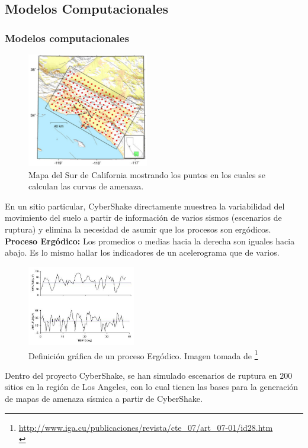 \documentclass{beamer}
\begin{document}
\subsection{Modelos Computacionales}
\begin{frame}[allowframebreaks]
\frametitle{Modelos computacionales}
%
\justifying
%
\begin{figure}[h]
	\centering
	\includegraphics[height=5cm]{img/Discretizacion.pdf}
	\caption{Mapa del Sur de California mostrando los puntos en los cuales se calculan las curvas de amenaza. \cite[figura 1, página 3]{gravesetal}}
\end{figure}
%
En un sitio particular, CyberShake directamente muestrea la variabilidad del movimiento del suelo a partir de información de varios sismos (escenarios de ruptura) y elimina la necesidad de asumir que los procesos son ergódicos.\\
%
\textbf{Proceso Ergódico:} Los promedios o medias hacia la derecha son iguales hacia abajo. Es lo mismo hallar los indicadores de un acelerograma que de varios.\\

\begin{figure}[h]
	\centering
	\includegraphics[height=3.5cm]{img/Ergodico.pdf}
	\caption{Definición gráfica de un proceso Ergódico. Imagen tomada de \footnote{\tiny \url{http://www.iga.cu/publicaciones/revista/cte_07/art_07-01/id28.htm}\\}}
\end{figure}
%
%
Dentro del proyecto CyberShake, se han simulado escenarios de ruptura en $200$ sitios en la región de Los Angeles, con lo cual tienen las bases para la generación de mapas de amenaza sísmica a partir de CyberShake.\\
%

%
%
\end{frame}
\end{document}
